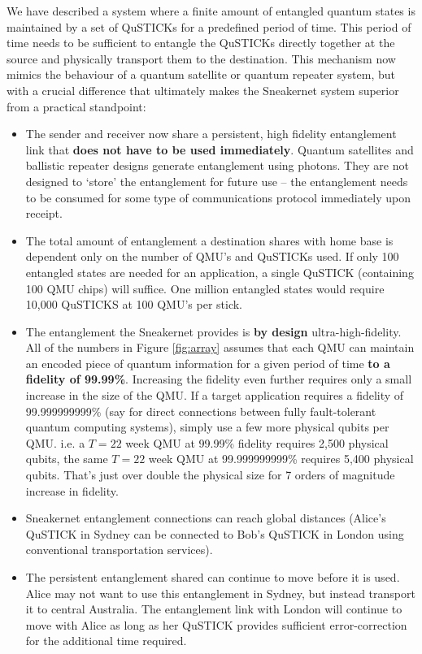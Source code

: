 \documentclass[twocolumn, aps, rmp, amsmath, amssymb, nofootinbib, superscriptaddress, longbibliography, floatfix, table-of-contents, eqsecnum]{revtex4-2}
\begin{document}
We have described a system where a finite amount of entangled quantum states is maintained by a set of QuSTICKs for a predefined period of time. This period of time needs to be sufficient to entangle the QuSTICKs directly together at the source and physically transport them to the destination. This mechanism now mimics the behaviour of a quantum satellite or quantum repeater system, but with a crucial difference that ultimately makes the Sneakernet system superior from a practical standpoint:
\begin{itemize}
\item The sender and receiver now share a persistent, high fidelity entanglement link that \textbf{does not have to be used immediately}. Quantum satellites and ballistic repeater designs generate entanglement using photons. They are not designed to `store' the entanglement for future use -- the entanglement needs to be consumed for some type of communications protocol immediately upon receipt.
\item The total amount of entanglement a destination shares with home base is dependent only on the number of QMU's and QuSTICKs used. If only 100 entangled states are needed for an application, a single QuSTICK (containing 100 QMU chips) will suffice. One million entangled states would require 10,000 QuSTICKS at 100 QMU's per stick. 
\item The entanglement the Sneakernet provides is \textbf{by design} ultra-high-fidelity. All of the numbers in Figure \ref{fig:array} assumes that each QMU can maintain an encoded piece of quantum information for a given period of time \textbf{to a fidelity of 99.99\%}. Increasing the fidelity even further requires only a small increase in the size of the QMU. If a target application requires a fidelity of 99.999999999\% (say for direct connections between fully fault-tolerant quantum computing systems), simply use a few more physical qubits per QMU. i.e. a $T= 22$ week QMU at 99.99\% fidelity requires 2,500 physical qubits, the same $T=22$ week QMU at 99.999999999\% requires 5,400 physical qubits. That's just over double the physical size for 7 orders of magnitude increase in fidelity.
\item Sneakernet entanglement connections can reach global distances (Alice's QuSTICK in Sydney can be connected to Bob's QuSTICK in London using conventional transportation services).
\item The persistent entanglement shared can continue to move before it is used. Alice may not want to use this entanglement in Sydney, but instead transport it to central Australia. The entanglement link with London will continue to move with Alice as long as her QuSTICK provides sufficient error-correction for the additional time required.
\end{itemize}
\end{document}
